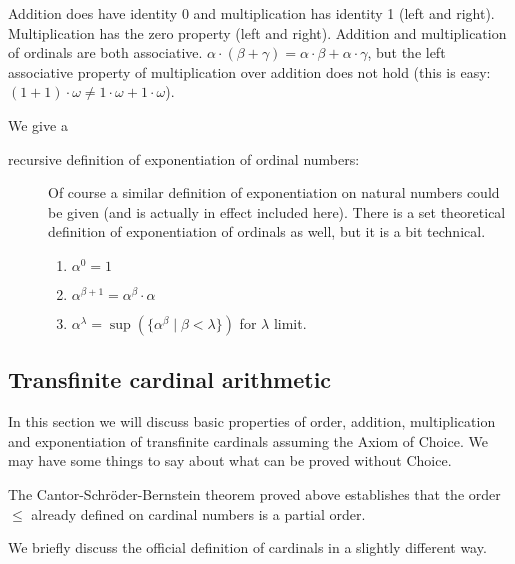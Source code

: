 \documentclass[12pt]{book}
\begin{document}
Addition does have identity 0 and multiplication has identity 1 (left and right).  Multiplication has the zero property (left and right).  Addition and multiplication of ordinals are both associative.   $\alpha \cdot (\beta + \gamma) = \alpha\cdot \beta + \alpha\cdot \gamma$, but the left associative property of multiplication over addition does not hold (this is easy:  $(1+1) \cdot \omega \neq 1 \cdot \omega + 1 \cdot \omega$).

We give a

\begin{description}
\item[recursive definition of exponentiation of ordinal numbers:]
Of course a similar definition of exponentiation on natural numbers
could be given (and is actually in effect included here).  There is a
set theoretical definition of exponentiation of ordinals as well, but
it is a bit technical.

\begin{enumerate}


\item $\alpha^0 = 1$

\item $\alpha^{\beta+1} = \alpha^\beta \cdot \alpha$

\item $\alpha^{\lambda} = \sup(\{\alpha^{\beta}\mid \beta<\lambda\})$ for $\lambda$ limit.

\end{enumerate}

\end{description}

\newpage


\subsection{Transfinite cardinal arithmetic}

In this section we will discuss basic properties of order, addition, multiplication and exponentiation of transfinite cardinals assuming the Axiom of Choice.
We may have some things to say about what can be proved without Choice.

The Cantor-Schr\"oder-Bernstein theorem proved above establishes that the order $\leq$ already defined on cardinal numbers is a partial order.

We briefly discuss the official definition of cardinals in a slightly different way.
\end{document}
